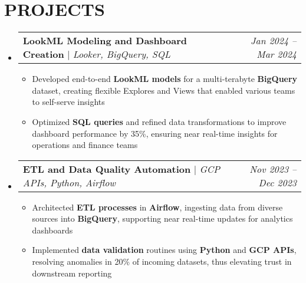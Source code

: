 \documentclass[letterpaper,11pt]{article}
\makeatletter
\newcommand{\resumeItem}[1]{
  \item\small{
    {#1 \vspace{-4pt}}
  }
}
\newcommand{\resumeProjectHeading}[2]{
    \item
    \begin{tabular*}{0.97\textwidth}{l@{\extracolsep{\fill}}r}
      \small#1 & #2 \\
    \end{tabular*}\vspace{-7pt}
}
\newcommand{\resumeSubHeadingListStart}{\begin{itemize}[leftmargin=0.15in, label={}]}
\newcommand{\resumeSubHeadingListEnd}{\end{itemize}}
\newcommand{\resumeItemListStart}{\begin{itemize}}
\newcommand{\resumeItemListEnd}{\end{itemize}\vspace{-5pt}}
\makeatother
\begin{document}
\section{\textbf{PROJECTS}}
  \resumeSubHeadingListStart
  
    \resumeProjectHeading
        {\textbf{LookML Modeling and Dashboard Creation} $|$ \emph{Looker, BigQuery, SQL}}{\textit{Jan 2024 – Mar 2024}}
        \resumeItemListStart
          \resumeItem{Developed end-to-end \textbf{LookML models} for a multi-terabyte \textbf{BigQuery} dataset, creating flexible Explores and Views that enabled various teams to self-serve insights}
          \resumeItem{Optimized \textbf{SQL queries} and refined data transformations to improve dashboard performance by 35\%, ensuring near real-time insights for operations and finance teams}
          
        \resumeItemListEnd
        
    \resumeProjectHeading
        {\textbf{ETL and Data Quality Automation} $|$ \emph{GCP APIs, Python, Airflow}}{\textit{Nov 2023 – Dec 2023}}
        \resumeItemListStart
          \resumeItem{Architected \textbf{ETL processes} in \textbf{Airflow}, ingesting data from diverse sources into \textbf{BigQuery}, supporting near real-time updates for analytics dashboards}
          \resumeItem{Implemented \textbf{data validation} routines using \textbf{Python} and \textbf{GCP APIs}, resolving anomalies in 20\% of incoming datasets, thus elevating trust in downstream reporting}
          
        \resumeItemListEnd

  \resumeSubHeadingListEnd
\end{document}
